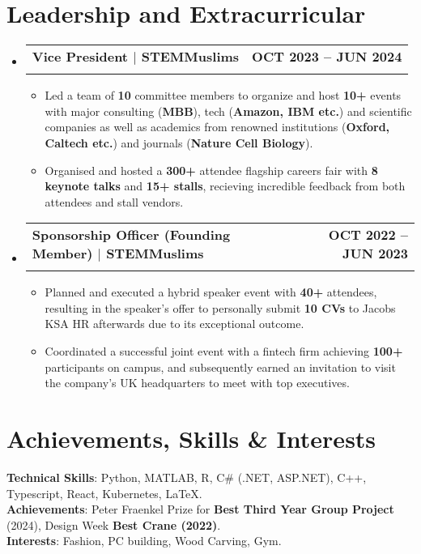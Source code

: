 \documentclass[a4paper,11pt]{article}
\makeatletter
\newcommand{\resumeItem}[1]{
  \item\small{
    {#1 \vspace{-2pt}}
  }
}
\newcommand{\resumeSubheading}[4]{
  \vspace{-2pt}\item
    \begin{tabular*}{\textwidth}[t]{l@{\extracolsep{\fill}}r}
      \textbf{#1} & \textbf{#2} \\
      \textit{\small#3} & \textit{\small #4} \\
    \end{tabular*}\vspace{-7pt}
}
\newcommand{\resumeSubHeadingListStart}{\begin{itemize}[leftmargin=0in, label={}]}
\newcommand{\resumeSubHeadingListEnd}{\end{itemize}}
\newcommand{\resumeItemListStart}{\begin{itemize}}
\newcommand{\resumeItemListEnd}{\end{itemize}\vspace{-5pt}}
\makeatother
\begin{document}
\section{Leadership and Extracurricular}
    \resumeSubHeadingListStart
      \resumeSubheading
      {Vice President $|$ STEMMuslims}{OCT 2023 -- JUN 2024}
      {}{}
      \resumeItemListStart
      \vspace{-4mm}
        \resumeItem{Led a team of \textbf{10} committee members to organize and host \textbf{10+} events with major consulting (\textbf{MBB}), tech (\textbf{Amazon, IBM etc.}) and scientific companies as well as academics from renowned institutions (\textbf{Oxford, Caltech etc.}) and journals (\textbf{Nature Cell Biology}).}
        \resumeItem{Organised and hosted a \textbf{300+} attendee flagship careers fair with \textbf{8 keynote talks} and \textbf{15+ stalls}, recieving incredible feedback from both attendees and stall vendors.}
      \resumeItemListEnd

      \resumeSubheading
      {Sponsorship Officer (Founding Member) $|$ STEMMuslims }{OCT 2022 -- JUN 2023}
      {}{}
      \resumeItemListStart
      \vspace{-4mm}
        \resumeItem{Planned and executed a hybrid speaker event with \textbf{40+} attendees, resulting in the speaker's offer to personally submit \textbf{10
        CVs} to Jacobs KSA HR afterwards due to its exceptional outcome.}
        \resumeItem{Coordinated a successful joint event with a fintech firm achieving \textbf{100+} participants on campus, and subsequently earned
        an invitation to visit the company's UK headquarters to meet with top executives.}
      \resumeItemListEnd

    \resumeSubHeadingListEnd

\section{Achievements, Skills \& Interests}
 \begin{itemize}[leftmargin=0.15in, label={}]
    \small{\item{
    \vspace{1mm}
     \textbf{Technical Skills}{: Python, MATLAB, R, C\# (.NET, ASP.NET), C++, Typescript, React, Kubernetes, \LaTeX.} \\
     \vspace{1mm}
      \textbf{Achievements}{: Peter Fraenkel Prize for \textbf{Best Third Year Group Project} (2024), Design Week \textbf{Best Crane (2022)}.} \\
     \textbf{Interests}{: Fashion, PC building, Wood Carving, Gym.} \\
     \vspace{1mm}

    }}
 \end{itemize}
\end{document}
